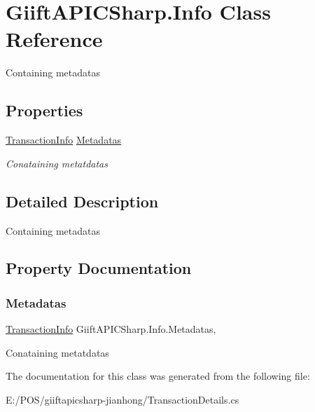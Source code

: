 \hypertarget{class_giift_a_p_i_c_sharp_1_1_info}{}\section{Giift\+A\+P\+I\+C\+Sharp.\+Info Class Reference}
\label{class_giift_a_p_i_c_sharp_1_1_info}


Containing metadatas  


\subsection*{Properties}
\begin{DoxyCompactItemize}
\item 
\hyperlink{class_giift_a_p_i_c_sharp_1_1_transaction_info}{Transaction\+Info} \hyperlink{class_giift_a_p_i_c_sharp_1_1_info_a6a12caaf894356f688ce3681fb34c3bf}{Metadatas}
\begin{DoxyCompactList}\small\item\em Conataining metatdatas \end{DoxyCompactList}\end{DoxyCompactItemize}


\subsection{Detailed Description}
Containing metadatas 



\subsection{Property Documentation}
\mbox{\label{class_giift_a_p_i_c_sharp_1_1_info_a6a12caaf894356f688ce3681fb34c3bf}} 
\subsubsection{\texorpdfstring{Metadatas}{Metadatas}}
{\footnotesize\ttfamily \hyperlink{class_giift_a_p_i_c_sharp_1_1_transaction_info}{Transaction\+Info} Giift\+A\+P\+I\+C\+Sharp.\+Info.\+Metadatas\hspace{0.3cm}{\ttfamily [get]}, {\ttfamily [set]}}



Conataining metatdatas 



The documentation for this class was generated from the following file\+:\begin{DoxyCompactItemize}
\item 
E\+:/\+P\+O\+S/giiftapicsharp-\/jianhong/Transaction\+Details.\+cs\end{DoxyCompactItemize}
